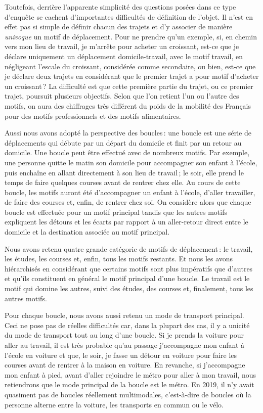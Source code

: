 \documentclass[
  9pt,
  a4paper,
  DIV=11]{scrreprt}
\begin{document}
Toutefois, derrière l'apparente simplicité des questions posées dans ce
type d'enquête se cachent d'importantes difficultés de définition de
l'objet. Il n'est en effet pas si simple de définir chacun des trajets
et d'y associer de manière \emph{univoque} un motif de déplacement. Pour
ne prendre qu'un exemple, si, en chemin vers mon lieu de travail, je
m'arrête pour acheter un croissant, est-ce que je déclare uniquement un
déplacement domicile-travail, avec le motif travail, en négligeant
l'escale du croissant, considérée comme secondaire, ou bien, est-ce que
je déclare deux trajets en considérant que le premier trajet a pour
motif d'acheter un croissant\,? La difficulté est que cette première
partie du trajet, ou ce premier trajet, poursuit plusieurs objectifs.
Selon que l'on retient l'un ou l'autre des motifs, on aura des
chiffrages très différent du poids de la mobilité des Français pour des
motifs professionnels et des motifs alimentaires.

Aussi nous avons adopté la perspective des boucles\,: une boucle est une
série de déplacements qui débute par un départ du domicile et finit par
un retour au domicile. Une boucle peut être effectué avec de nombreux
motifs. Par exemple, une personne quitte le matin son domicile pour
accompagner son enfant à l'école, puis enchaîne en allant directement à
son lieu de travail\,; le soir, elle prend le temps de faire quelques
courses avant de rentrer chez elle. Au cours de cette boucle, les motifs
auront été d'accompagner un enfant à l'école, d'aller travailler, de
faire des courses et, enfin, de rentrer chez soi. On considère alors que
chaque boucle est effectuée pour un motif principal tandis que les
autres motifs expliquent les détours et les écarts par rapport à un
aller-retour direct entre le domicile et la destination associée au
motif principal.

Nous avons retenu quatre grande catégorie de motifs de déplacement\,: le
travail, les études, les courses et, enfin, tous les motifs restants. Et
nous les avons hiérarchisés en considérant que certains motifs sont plus
impératifs que d'autres et qu'ils constituent en général le motif
principal d'une boucle. Le travail est le motif qui domine les autres,
suivi des études, des courses et, finalement, tous les autres motifs.

Pour chaque boucle, nous avons aussi retenu un mode de transport
principal. Ceci ne pose pas de réelles difficultés car, dans la plupart
des cas, il y a unicité du mode de transport tout au long d'une boucle.
Si je prends la voiture pour aller au travail, il est très probable
qu'au passage j'accompagne mon enfant à l'école en voiture et que, le
soir, je fasse un détour en voiture pour faire les courses avant de
rentrer à la maison en voiture. En revanche, si j'accompagne mon enfant
à pied, avant d'aller rejoindre le métro pour aller à mon travail, nous
retiendrons que le mode principal de la boucle est le métro. En 2019, il
n'y avait quasiment pas de boucles réellement multimodales, c'est-à-dire
de boucles où la personne alterne entre la voiture, les transports en
commun ou le vélo.
\end{document}
